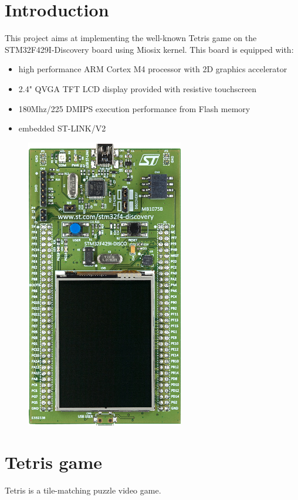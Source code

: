 \documentclass[18pt,oneside,a4paper, titlepage]{article}
\begin{document}
\section{Introduction}
	This project aims at implementing the well-known Tetris game on the STM32F429I-Discovery board using Miosix kernel. This board is equipped with:
	\begin{itemize}
		\item high performance ARM Cortex M4 processor with 2D graphics accelerator
		\item 2.4" QVGA TFT LCD display provided with resistive touchscreen
		\item 180Mhz/225 DMIPS execution performance from Flash memory
		\item embedded ST-LINK/V2
	\end{itemize}
	\vspace{1cm}
	\begin{figure}[h]
		\centering
		\includegraphics[scale=0.7]{board.jpg}
	\end{figure}
	
\newpage
\section{Tetris game}
	Tetris is a tile-matching puzzle video game.
\end{document}
